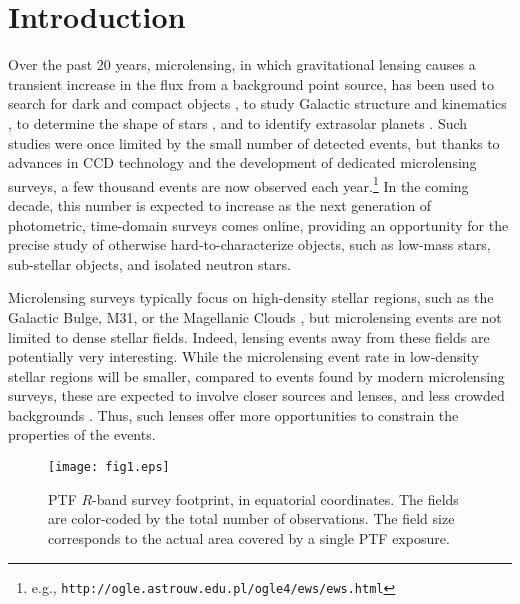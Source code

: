 \documentclass{emulateapj}
\begin{document}
\section{Introduction}
Over the past 20 years, microlensing, in which gravitational lensing causes a transient increase in the flux from a background point source, has been used to search for dark and compact objects \citep{original_macho, oslowski2008, sartore2010}, to study Galactic structure and kinematics \citep{binney2000}, to determine the shape of stars \citep{rattenbury2005}, and to identify extrasolar planets \citep[][and references therein]{gaudi2011}. Such studies were once limited by the small number of detected events, but thanks to advances in CCD technology and the development of dedicated microlensing surveys, a few thousand events are now observed each year.\footnote{e.g., {\tt http://ogle.astrouw.edu.pl/ogle4/ews/ews.html}} In the coming decade, this number is expected to increase as the next generation of photometric, time-domain surveys comes online, providing an opportunity for the precise study of otherwise hard-to-characterize objects, such as low-mass stars, sub-stellar objects, and isolated neutron stars. 

Microlensing surveys typically focus on high-density stellar regions, such as the Galactic Bulge, M31, or the Magellanic Clouds \citep[e.g.,][]{original_ogle, original_macho, eros_original, crotts1996}, but microlensing events are not limited to dense stellar fields. Indeed, lensing events away from these fields are potentially very interesting. While the microlensing event rate in low-density stellar regions will be smaller, compared to events found by modern microlensing surveys, these are expected to involve closer sources and lenses, and less crowded backgrounds \citep{mesolensing}. Thus, such lenses offer more opportunities to constrain the properties of the events.

\begin{figure*}[!t]
\centering\texttt{[image: fig1.eps]}
\caption{PTF $R$-band survey footprint, in equatorial coordinates. The fields are color-coded by the total number of observations. The field size corresponds to the actual area covered by a single PTF exposure.}\label{fig:survey_footprint}
\end{figure*}	
\end{document}

